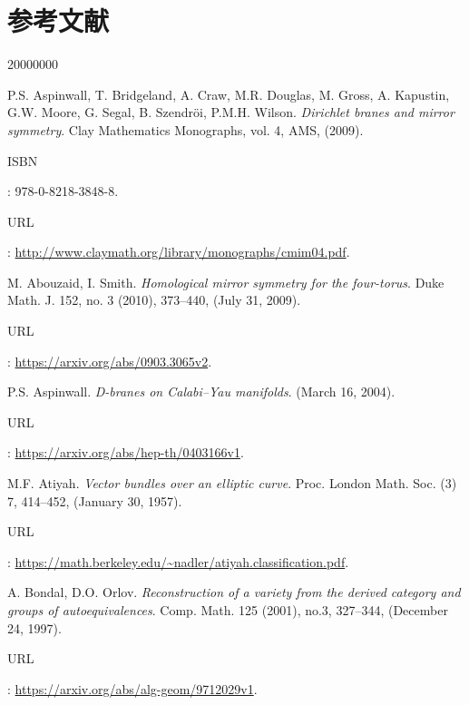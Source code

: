 
\clearpage
\section*{参考文献}


\begin{thebibliography}{20000000}
\vspace*{0.5cm}

\bibitem[ABC+09]{[ABC+09]} P.S. Aspinwall, T. Bridgeland, A. Craw, M.R. Douglas, M. Gross, A. Kapustin, G.W. Moore, G. Segal, B. Szendröi, P.M.H. Wilson. \textit{Dirichlet branes and mirror symmetry}. Clay Mathematics Monographs, vol. 4, AMS, (2009).
\begin{footnotesize}ISBN\end{footnotesize}: 978-0-8218-3848-8. \begin{footnotesize}URL\end{footnotesize}: \url{http://www.claymath.org/library/monographs/cmim04.pdf}.

\bibitem[AS09]{[AS09]} M. Abouzaid, I. Smith. \textit{Homological mirror symmetry for the four-torus}. Duke Math. J. 152, no. 3 (2010), 373--440, (July 31, 2009). \begin{footnotesize}URL\end{footnotesize}: \url{https://arxiv.org/abs/0903.3065v2}.

\bibitem[Asp04]{[Asp04]} P.S. Aspinwall. \textit{D-branes on Calabi--Yau manifolds}. (March 16, 2004). \begin{footnotesize}URL\end{footnotesize}: \url{https://arxiv.org/abs/hep-th/0403166v1}.

\bibitem[Ati57]{[Ati57]} M.F. Atiyah. \textit{Vector bundles over an elliptic curve}. Proc. London Math. Soc. (3) 7, 414--452, (January 30, 1957). \begin{footnotesize}URL\end{footnotesize}: \url{https://math.berkeley.edu/~nadler/atiyah.classification.pdf}.

\bibitem[BO97]{[BO97]} A. Bondal, D.O. Orlov. \textit{Reconstruction of a variety from the derived category and groups of autoequivalences}. Comp. Math. 125 (2001), no.3, 327--344, (December 24, 1997). \begin{footnotesize}URL\end{footnotesize}: \url{https://arxiv.org/abs/alg-geom/9712029v1}.


\end{thebibliography}
